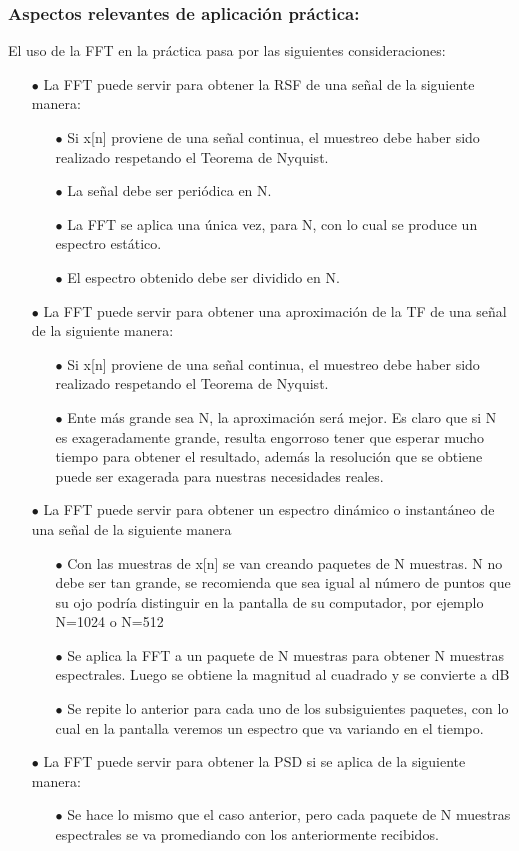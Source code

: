 \subsubsection{Aspectos relevantes de aplicación práctica:}
El uso de la FFT en la práctica pasa por las siguientes consideraciones:
\begin{itemize}
	\item  [$\bullet$] La FFT puede servir para obtener la RSF de una señal de la siguiente manera:
	\begin{itemize}
		\item [$\bullet$]  Si x[n] proviene de una señal continua, el muestreo debe haber sido realizado respetando el Teorema de Nyquist.
		\item [$\bullet$]  La señal debe ser periódica en N.
		\item [$\bullet$]  La FFT se aplica una única vez, para N, con lo cual se produce un espectro estático.
		\item [$\bullet$]  El espectro obtenido debe ser dividido en N.
	\end{itemize}
	\item [$\bullet$] La FFT puede servir para obtener una aproximación de la TF de una señal de la siguiente manera:
	\begin{itemize}
	\item [$\bullet$]  Si x[n] proviene de una señal continua, el muestreo debe haber sido realizado respetando el Teorema de Nyquist. 
	\item [$\bullet$]  Ente más grande sea N, la aproximación será mejor. Es claro que si N es exageradamente grande, resulta engorroso tener que esperar mucho tiempo para obtener el resultado, además la resolución que se obtiene puede ser exagerada para nuestras necesidades reales.
	\end{itemize}

	\item [$\bullet$]  La FFT puede servir para obtener un espectro dinámico o instantáneo de una señal de la siguiente manera
		\begin{itemize}
	\item [$\bullet$]  Con las muestras de x[n] se van creando paquetes de N muestras. N no debe ser tan grande, se recomienda que sea igual al número de puntos que su ojo podría distinguir en la pantalla de su computador, por ejemplo N=1024 o N=512
	\item [$\bullet$]  Se aplica la FFT a un paquete de N muestras para obtener N muestras espectrales. Luego se obtiene la magnitud al cuadrado y se convierte a dB 
	\item [$\bullet$]  Se repite lo anterior para cada uno de los subsiguientes paquetes, con lo cual en la pantalla veremos un espectro que va variando en el tiempo.
		\end{itemize}
	\item [$\bullet$]  La FFT puede servir para obtener la PSD si se aplica de la siguiente manera:
		\begin{itemize}
		\item [$\bullet$]  Se hace lo mismo que el caso anterior, pero cada paquete de N muestras espectrales se va promediando con los anteriormente recibidos.
		\end{itemize}
\end{itemize}
